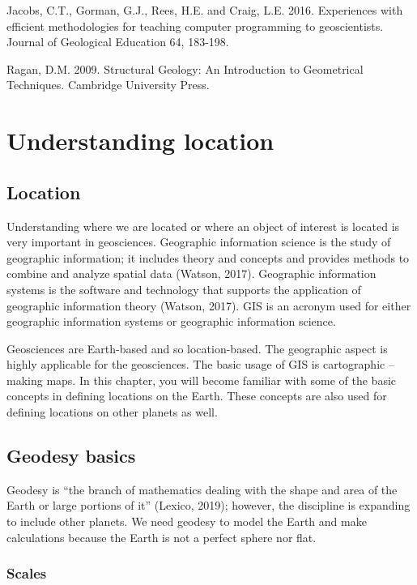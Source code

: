 \documentclass[a4paper , 12pt]{book}
\begin{document}
Jacobs, C.T., Gorman, G.J., Rees, H.E. and Craig, L.E. 2016. Experiences with efficient methodologies for teaching computer programming to geoscientists. Journal of Geological Education 64, 183-198.

Ragan, D.M. 2009. Structural Geology: An Introduction to Geometrical Techniques. Cambridge University Press.

\chapter{Understanding location}

\section{Location}

Understanding where we are located or where an object of interest is located is very important in geosciences. Geographic information science is the study of geographic information; it includes theory and concepts and provides methods to combine and analyze spatial data (Watson, 2017). Geographic information systems is the software and technology that supports the application of geographic information theory (Watson, 2017). GIS is an acronym used for either geographic information systems or geographic information science. 

Geosciences are Earth-based and so location-based. The geographic aspect is highly applicable for the geosciences. The basic usage of GIS is cartographic – making maps. In this chapter, you will become familiar with some of the basic concepts in defining locations on the Earth. These concepts are also used for defining locations on other planets as well.

\section{Geodesy basics}

Geodesy is “the branch of mathematics dealing with the shape and area of the Earth or large portions of it” (Lexico, 2019); however, the discipline is expanding to include other planets. We need geodesy to model the Earth and make calculations because the Earth is not a perfect sphere nor flat.

\subsection{Scales}
\end{document}
